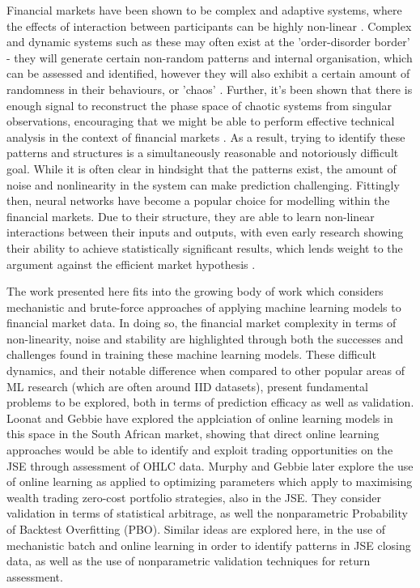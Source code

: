 \documentclass[a4paper,11pt,oneside]{article}
\theoremstyle{plain}
\theoremstyle{definition}
\begin{document}
	Financial markets have been shown to be complex and adaptive systems, where the effects of interaction 
	between participants can be highly non-linear \cite {Arthur}. Complex and dynamic systems such as these may 
	often exist at the 'order-disorder border' - they will generate certain non-random patterns and internal organisation, 
	which can be assessed and identified, however they will also exhibit a certain amount of randomness in their behaviours, 
	or 'chaos' \cite {Crutchfield}. Further, it's been shown that there is enough signal to reconstruct 
	the phase space of chaotic systems from singular observations, encouraging that we might be able to perform 
	effective technical analysis in the context of financial markets \cite{Packard, Takens}. As a result, trying to identify these patterns and structures is a simultaneously 
	reasonable and notoriously difficult goal. While it is often clear in hindsight that the patterns exist, the amount of 
	noise and nonlinearity in the system can make prediction challenging.
	Fittingly then, neural networks have become a popular choice for modelling within the financial markets. Due to 
	their structure, they are able to learn non-linear interactions between their inputs and outputs, with even early research 
	showing their ability to achieve statistically significant results, which lends weight to the 
	argument against the efficient market hypothesis \cite {Skabar}. 
	\hfill \break
	
	The work presented here fits into the growing body of work which considers mechanistic and brute-force approaches of applying 
	machine learning models to financial market data. In doing so, the financial market complexity in terms of non-linearity, noise and stability are highlighted through 
	both the successes and challenges found in training these machine learning models. These difficult dynamics, and their notable difference when 
	compared to other popular areas of ML research (which are often around IID datasets), present fundamental problems to be explored, both 
	in terms of prediction efficacy as well as validation. Loonat and Gebbie \cite{Loonat} have explored the applciation of online learning models in this space
	 in the South African market, showing that direct online learning approaches would be able to identify and exploit trading opportunities on the JSE through assessment 
	 of OHLC data. Murphy and Gebbie \cite{MurphyGebbie} later explore the use of online learning as applied to optimizing parameters which apply to maximising wealth trading zero-cost portfolio strategies, also in the JSE. They consider validation in terms of statistical arbitrage, as well the nonparametric Probability of Backtest Overfitting (PBO). Similar ideas are explored here, in the use of mechanistic batch and online learning in order to identify patterns in JSE closing data, as well as the use of nonparametric validation techniques for return assessment.
	
\end{document}
